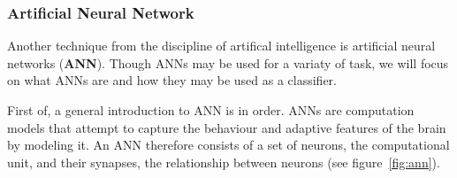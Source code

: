 \subsubsection{Artificial Neural Network}
	Another technique from the discipline of artifical intelligence is artificial neural networks (\textbf{ANN}).
	Though ANNs may be used for a variaty of task, we will focus on what ANNs are and how they may be used as
	a classifier. 
	
	\bigskip\noindent
	First of, a general introduction to ANN is in order. ANNs are computation models that attempt to capture
	the behaviour and adaptive features of the brain by modeling it. 
	An ANN therefore consists of a set of neurons, the computational unit, and their synapses, the relationship between neurons (see figure~\ref{fig:ann}).
	
	
	
	